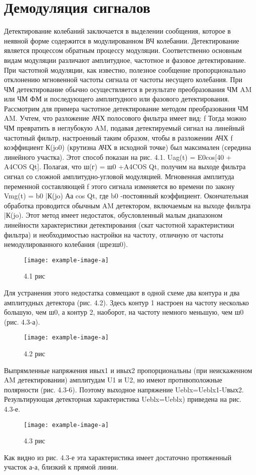 ﻿\documentclass[a4paper,12pt]{article}
\begin{document}
\section{Демодуляция сигналов}
Детектирование колебаний заключается в выделении сообщения, которое в неявной форме содержится в модулированном ВЧ колебании. Детектирование является процессом обратным процессу модуляции. Соответственно основным видам модуляции различают амплитудное, частотное и фазовое детектирование.
При частотной модуляции, как известно, полезное сообщение пропорционально отклонению мгновенной частоты сигнала от частоты несущего колебания.
При ЧМ детектирование обычно осуществляется в результате преобразования ЧМ  AM или ЧМ  ФМ и последующего амплитудного или фазового детектирования.
Рассмотрим для примера частотное детектирование методом преобразования ЧМ 
AM.
Учтем, что разложение АЧХ полосового фильтра имеет вид:
f
Тогда можно ЧМ превратить в неглубокую AM, подавая детектируемый сигнал на линейный частотный фильтр, настроенный таким образом, чтобы в разложении АЧХ
f
коэффициент К(jo0) (крутизна АЧХ в исходной точке) был максимален (середина линейного участка). Этот способ показан на рис. 4.1. Uag(t) = E0cos[40 + A4COS Qt]. Полагая, что ш(г) = ш0 +A4COS Qt, получим на выходе фильтра сигнал со сложной амплитудно-угловой модуляцией. Мгновенная амплитуда переменной составляющей
f
этого сигнала изменяется во времени по закону Vmg(t) = b0 |К(jo) Аа cos Qt, где b0 -постоянный коэффициент. Окончательная обработка проводится обычным AM детектором, включаемым на выходе фильтра |К(jo).
Этот метод имеет недостаток, обусловленный малым диапазоном линейности характеристики детектирования (скат частотной характеристики фильтра) и необходимостью настройки на частоту, отличную от частоты немодулированного колебания (шрезш0).
\begin{figure}[H]
	\centering
	\texttt{[image: example-image-a]}
	\caption{4.1 рис}
\end{figure}
Для устранения этого недостатка совмещают в одной схеме два контура и два амплитудных детектора (рис. 4.2).
Здесь контур 1 настроен на частоту несколько большую, чем ш0, а контур 2, наоборот, на частоту немного меньшую, чем ш0 (рис. 4.3-а).
\begin{figure}[H]
	\centering
	\texttt{[image: example-image-a]}
	\caption{4.2 рис}
\end{figure}
Выпрямленные напряжения ивых1 и ивых2 пропорциональны (при неискаженном AM детектировании) амплитудам U1 и U2, но имеют противоположные полярности (рис. 4.3-6). Поэтому выходное напряжение Ueblx=Ueblx1-Uвых2. Результирующая детекторная характеристика Ueblx=Ueblx) приведена на рис. 4.3-е.
\begin{figure}[H]
	\centering
	\texttt{[image: example-image-a]}
	\caption{4.3 рис}
\end{figure}
Как видно из рис. 4.3-е эта характеристика имеет достаточно протяженный участок а-а, близкий к прямой линии.
\end{document}
